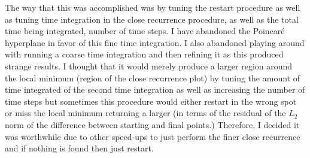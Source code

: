 The way that this was accomplished was by tuning the restart procedure as
well as tuning time integration in the close recurrence procedure, as
well as the total time being integrated, number of time steps. I have
abandoned the Poincar\'e hyperplane in favor of this fine time
integration. I also abandoned playing around with running a coarse time
integration and then refining it as this produced strange results. I
thought that it would merely produce a larger region around the local
minimum (region of the close recurrence plot) by tuning the amount of
time integrated of the second time integration as well as increasing the
number of time steps but sometimes this procedure would either restart in
the wrong spot or miss the local minimum returning a larger (in terms of
the residual of the $L_2$ norm of the difference between starting and
final points.) Therefore, I decided it was worthwhile due to other
speed-ups to just perform the finer close recurrence and if nothing is
found then just restart. 



